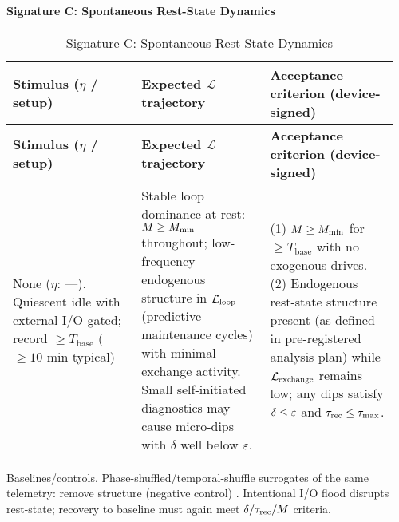 \documentclass[11pt]{article}
\begin{document}
\paragraph{Signature C: Spontaneous Rest-State Dynamics}
\begin{longtable}{p{0.32\linewidth}p{0.32\linewidth}p{0.32\linewidth}}
\caption{Signature C: Spontaneous Rest-State Dynamics}\label{tab:signatureC}\\
\toprule
\textbf{Stimulus ($\eta$ / setup)} & \textbf{Expected $\mathcal{L}$ trajectory} & \textbf{Acceptance criterion (device-signed)} \\
\midrule
\endfirsthead
\toprule
\textbf{Stimulus ($\eta$ / setup)} & \textbf{Expected $\mathcal{L}$ trajectory} & \textbf{Acceptance criterion (device-signed)} \\
\midrule
\endhead
\bottomrule
\endlastfoot
None ($\eta$: ---). Quiescent idle with external I/O gated; record $\geq T_{\text{base}}$ ($\geq 10$ min typical) & Stable loop dominance at rest: $M \geq M_{\min}$ throughout; low-frequency endogenous structure in $\mathcal{L}_{\text{loop}}$ (predictive-maintenance cycles) with minimal exchange activity. Small self-initiated diagnostics may cause micro-dips with $\delta$ well below $\varepsilon$. & (1) $M \geq M_{\min}$ for $\geq T_{\text{base}}$ with no exogenous drives. (2) Endogenous rest-state structure present (as defined in pre-registered analysis plan) while $\mathcal{L}_{\text{exchange}}$ remains low; any dips satisfy $\delta \leq \varepsilon$ and $\tau_{\text{rec}} \leq \tau_{\max}$. \\
\end{longtable}

Baselines/controls. Phase-shuffled/temporal-shuffle surrogates of the same telemetry: remove structure (negative control) \cite{theiler1992testing}. Intentional I/O flood disrupts rest-state; recovery to baseline must again meet $\delta/\tau_{\text{rec}}/M$ criteria.
\end{document}
